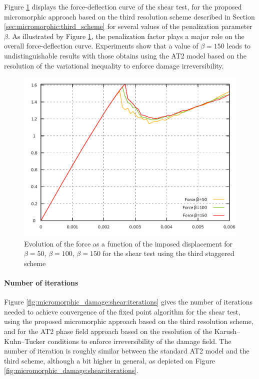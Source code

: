 Figure \ref{fig:micromorphic_damage:beta} displays the force-deflection curve of the shear test, for the
proposed micromorphic approach based on the third resolution scheme described in Section \ref{sec:micromorphic:third_scheme} for several values
of the penalization parameter $\beta$.
As illustrated by Figure \ref{fig:micromorphic_damage:beta}, the
penalization factor plays a major role on the overall
force-deflection curve. Experiments show that a value of
$\beta = 150$ leads to undistinguishable results with those obtains using the AT2 model based
on the resolution of the variational inequality to enforce damage irreversibility.

\begin{figure}[H]
  \centering
  \includegraphics[width=10.cm]{../chapter_003_ef_micromorphic/figures/shear-force.pdf}
  \caption{Evolution of the force as a function of the imposed displacement for
  \(\beta=50\), \(\beta=100\), \(\beta=150\) for the shear test using the
  third staggered scheme}
  \label{fig:micromorphic_damage:beta}
\end{figure}

\paragraph{Number of iterations}

Figure \ref{fig:micromorphic_damage:shear:iterations} gives the number of iterations needed to achieve convergence of the fixed point algorithm
for the shear test, using the
proposed micromorphic approach based on the third resolution scheme, and for the AT2 phase field approach based on the resolution of the Karush–Kuhn–Tucker conditions
to enforce irreversibility of the damage field.
The number of iteration is roughly
similar between the standard AT2 model and the third scheme, although a
bit higher in general, as depicted on Figure
\ref{fig:micromorphic_damage:shear:iterations}.

